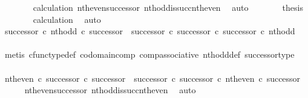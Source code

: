 \begin{isabellebody}
\ \ \ \ \ \ \isamarkupfalse%
\ calculation\ nth{\isacharunderscore}{\kern0pt}even{\isacharunderscore}{\kern0pt}successor{}\ nth{\isacharunderscore}{\kern0pt}odd{\isacharunderscore}{\kern0pt}is{\isacharunderscore}{\kern0pt}succ{\isacharunderscore}{\kern0pt}nth{\isacharunderscore}{\kern0pt}even\ \isamarkupfalse%
\ auto\isanewline
\ \ \ \ \isamarkupfalse%
\ \isamarkupfalse%
\ {\isacharquery}{\kern0pt}thesis\isanewline
\ \ \ \ \ \ \isamarkupfalse%
\ calculation\ \isamarkupfalse%
\ auto\isanewline
\ \ \isamarkupfalse%
\isanewline
\isanewline
\ \ \isamarkupfalse%
\ {\isachardoublequoteopen}{\isacharparenleft}{\kern0pt}successor\ {\isasymcirc}\isactrlsub c\ nth{\isacharunderscore}{\kern0pt}odd{\isacharparenright}{\kern0pt}\ {\isasymcirc}\isactrlsub c\ successor\ {\isacharequal}{\kern0pt}\ {\isacharparenleft}{\kern0pt}successor\ {\isasymcirc}\isactrlsub c\ successor{\isacharparenright}{\kern0pt}\ {\isasymcirc}\isactrlsub c\ successor\ {\isasymcirc}\isactrlsub c\ nth{\isacharunderscore}{\kern0pt}odd{\isachardoublequoteclose}\isanewline
\ \ \ \ \isamarkupfalse%
\ {\isacharparenleft}{\kern0pt}metis\ cfunc{\isacharunderscore}{\kern0pt}type{\isacharunderscore}{\kern0pt}def\ codomain{\isacharunderscore}{\kern0pt}comp\ comp{\isacharunderscore}{\kern0pt}associative\ nth{\isacharunderscore}{\kern0pt}odd{\isacharunderscore}{\kern0pt}def{}\ successor{\isacharunderscore}{\kern0pt}type{\isacharparenright}{\kern0pt}\isanewline
\ \ \isamarkupfalse%
\ \isamarkupfalse%
\ {\isachardoublequoteopen}{\isacharparenleft}{\kern0pt}nth{\isacharunderscore}{\kern0pt}even\ {\isasymcirc}\isactrlsub c\ successor{\isacharparenright}{\kern0pt}\ {\isasymcirc}\isactrlsub c\ successor\ {\isacharequal}{\kern0pt}\ {\isacharparenleft}{\kern0pt}successor\ {\isasymcirc}\isactrlsub c\ successor{\isacharparenright}{\kern0pt}\ {\isasymcirc}\isactrlsub c\ nth{\isacharunderscore}{\kern0pt}even\ {\isasymcirc}\isactrlsub c\ successor{\isachardoublequoteclose}\isanewline
\ \ \ \ \isamarkupfalse%
\ nth{\isacharunderscore}{\kern0pt}even{\isacharunderscore}{\kern0pt}successor{}\ nth{\isacharunderscore}{\kern0pt}odd{\isacharunderscore}{\kern0pt}is{\isacharunderscore}{\kern0pt}succ{\isacharunderscore}{\kern0pt}nth{\isacharunderscore}{\kern0pt}even\ \isamarkupfalse%
\ auto\isanewline
{}\isamarkupfalse%
%
\endisatagproof
{\isafoldproof}%
%
\isadelimproof
%

\end{isabellebody}
